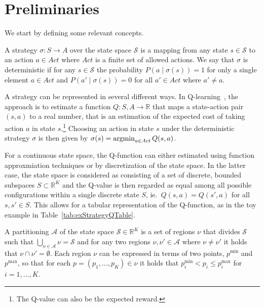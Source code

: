 \section{Preliminaries}%
\label{sec:preliminaries}

We start by defining some relevant concepts.

\begin{definition}[Strategy]%
    A strategy $\sigma : S \to A$ over the state space $\mathcal{S}$ is a
    mapping from any state $s \in \mathcal{S}$ to an action $a \in Act$ where
    $Act$ is a finite set of allowed actions. We say that $\sigma$ is
    deterministic if for any $s \in \mathcal{S}$ the probability
    $P(a\mid\sigma(s)) = 1$ for only a single element $a \in Act$ and
    $P(a'\mid\sigma(s)) = 0$ for all $a' \in Act$ where $a' \neq a$.
\end{definition}

A strategy can be represented in several different ways. In
Q-learning~\cite{Sutton1998}, the approach is to estimate a function $Q : S, A
\to \mathbb{R}$ that maps a state-action pair $(s,a)$ to a real number, that is
an estimation of the expected cost of taking action $a$ in state
$s$.\footnote{The Q-value can also be the expected reward.} Choosing an action
in state $s$ under the deterministic strategy $\sigma$ is then given by
$\sigma(s) = \operatorname*{argmin}_{a \in Act}Q(s,a)$.

For a continuous state space, the Q-function can either estimated using function
approxmiation techniques or by discretization of the state space. In the latter
case, the state space is considered as consisting of a set of discrete, bounded
subspaces $S \subset \mathbb{R}^K$ and the Q-value is then regarded as equal
among all possible configurations within a single discrete state $S$, ie.\
$Q(s,a) = Q(s',a)$ for all $s,s' \in S$. This allows for a tabular
representation of the Q-function, as in the toy example in
Table~\ref{tab:exStrategyQTable}.

\begin{definition}[Partitions]%
    A partitioning $\mathcal{A}$ of the state space $\mathcal{S} \in
    \mathbb{R}^K$ is a set of regions $\nu$ that divides $\mathcal{S}$ such that
    $\bigcup_{\nu \in \mathcal{A}}\nu = \mathcal{S}$ and for any two regions
    $\nu, \nu' \in \mathcal{A}$ where $\nu \neq \nu'$ it holds that $\nu \cap
    \nu' = \emptyset$. Each region $\nu$ can be expressed in terms of two
    points, $p^{\min}$ and $p^{\max}$, so that for each $p = (p_1, \ldots, p_K)
    \in \nu$ it holds that $p^{\min}_i < p_i \le  p^{\max}_i$ for $i =
    1,\ldots,K$.
\end{definition}

